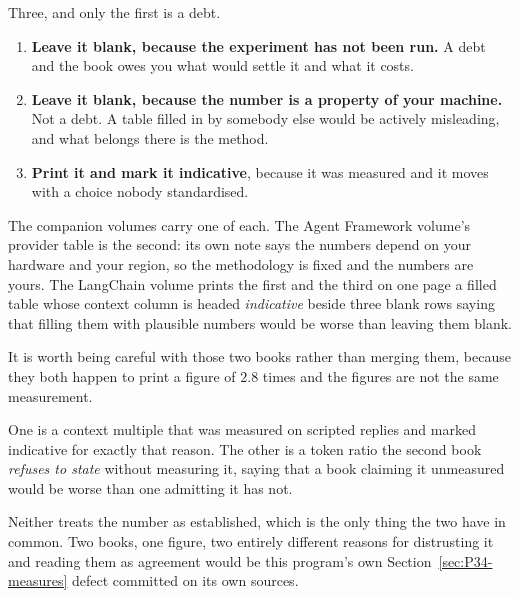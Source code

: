 \begin{fr}
\begin{ansblock}
Three, and only the first is a debt.

\begin{enumerate}
\item \textbf{Leave it blank, because the experiment has not been run.} A
  debt \dash{} and the book owes you what would settle it and what it costs.
\item \textbf{Leave it blank, because the number is a property of your
  machine.} Not a debt. A table filled in by somebody else would be actively
  misleading, and what belongs there is the method.
\item \textbf{Print it and mark it indicative}, because it was measured and
  it moves with a choice nobody standardised.
\end{enumerate}
\end{ansblock}

The companion volumes carry one of each. The Agent Framework volume's
provider table is the second: its own note says the numbers depend on your
hardware and your region, so the methodology is fixed and the numbers are
yours. The LangChain volume prints the first and the third on one page
\dash{} a filled table whose context column is headed \emph{indicative}
beside three blank rows saying that filling them with plausible numbers
would be worse than leaving them blank.
\end{fr}

\begin{fr}
It is worth being careful with those two books rather than merging them,
because they both happen to print a figure of $\num{2.8}$ times and the
figures are not the same measurement.

One is a context multiple that was measured on scripted replies and marked
indicative for exactly that reason. The other is a token ratio the second
book \emph{refuses to state} without measuring it, saying that a book
claiming it unmeasured would be worse than one admitting it has not.

Neither treats the number as established, which is the only thing the two
have in common. Two books, one figure, two entirely different reasons for
distrusting it \dash{} and reading them as agreement would be this
program's own Section~\ref{sec:P34-measures} defect committed on its own
sources.
\end{fr}

